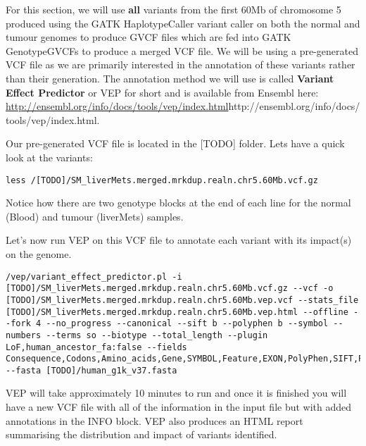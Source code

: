 For this section, we will use \textbf{all} variants from the first 60Mb of chromosome 5 produced using the GATK HaplotypeCaller variant caller on both the normal and tumour genomes to produce GVCF files which are fed into GATK GenotypeGVCFs to produce a merged VCF file. We will be using a pre-generated VCF file as we are primarily interested in the annotation of these variants rather than their generation. The annotation method we will use is called \textbf{Variant Effect Predictor} or VEP for short and is available from Ensembl here: \url{http://ensembl.org/info/docs/tools/vep/index.html}{http://ensembl.org/info/docs/tools/vep/index.html}.

\begin{steps}
Our pre-generated VCF file is located in the [TODO] folder. Lets have a quick look at the variants:
\begin{lstlisting}
less /[TODO]/SM_liverMets.merged.mrkdup.realn.chr5.60Mb.vcf.gz
\end{lstlisting}
\end{steps}

Notice how there are two genotype blocks at the end of each line for the normal (Blood) and tumour (liverMets) samples.

Let's now run VEP on this VCF file to annotate each variant with its impact(s) on the genome.

\begin{steps}
\begin{lstlisting}
/vep/variant_effect_predictor.pl -i [TODO]/SM_liverMets.merged.mrkdup.realn.chr5.60Mb.vcf.gz --vcf -o [TODO]/SM_liverMets.merged.mrkdup.realn.chr5.60Mb.vep.vcf --stats_file [TODO]/SM_liverMets.merged.mrkdup.realn.chr5.60Mb.vep.html --offline --fork 4 --no_progress --canonical --sift b --polyphen b --symbol --numbers --terms so --biotype --total_length --plugin LoF,human_ancestor_fa:false --fields Consequence,Codons,Amino_acids,Gene,SYMBOL,Feature,EXON,PolyPhen,SIFT,Protein_position,BIOTYPE,CANONICAL,Feature_type,cDNA_position,CDS_position,Existing_variation,DISTANCE,STRAND,CLIN_SIG,LoF_flags,LoF_filter,LoF,RadialSVM_score,RadialSVM_pred,LR_score,LR_pred,CADD_raw,CADD_phred,Reliability_index,HGVSc,HGVSp --fasta [TODO]/human_g1k_v37.fasta
\end{lstlisting}
\end{steps}

VEP will take approximately 10 minutes to run and once it is finished you will have a new VCF file with all of the information in the input file but with added annotations in the INFO block. VEP also produces an HTML report summarising the distribution and impact of variants identified.

